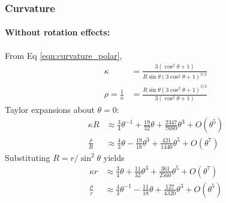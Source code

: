 \documentclass{article}
\begin{document}
\subsubsection{Curvature}

\paragraph{Without rotation effects:}
From Eq \eqref{eqn:curvature_polar},
\begin{equation}
    \begin{aligned}
        \kappa &= \frac{3(\cos^2\theta + 1)}{R\sin\theta(3\cos^2\theta + 1)^{3/2}} \\
        \rho = \frac{1}{\kappa}
            &= \frac{R\sin\theta(3\cos^2\theta + 1)^{3/2}}{3(\cos^2\theta + 1)}
    \end{aligned}
\end{equation}
Taylor expansions about $\theta = 0$:
\begin{equation}
    \begin{aligned}
        \kappa R &\approx \frac34 \theta^{-1} + \frac{19}{32} \theta + \frac{2347}{7680} \theta^3 + O(\theta^5) \\
        \frac{\rho}{R} &\approx \frac43 \theta - \frac{19}{18}\theta^3 + \frac{421}{1440}\theta^5 + O(\theta^7)
    \end{aligned}
\end{equation}
Substituting $R = r/\sin^2\theta$ yields
\begin{equation}
    \begin{aligned}
        \kappa r &\approx \frac34 \theta + \frac{11}{32} \theta^3 + \frac{361}{2560} \theta^5 + O(\theta^7) \\
        \frac{\rho}{r} &\approx \frac43 \theta^{-1} - \frac{11}{18}\theta + \frac{127}{4320}\theta^3 + O(\theta^5)
    \end{aligned}
\end{equation}
\end{document}
